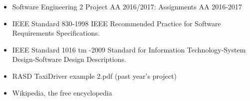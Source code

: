 \begin{itemize}
	\item Software Engineering 2 Project AA 2016/2017: Assignments AA 2016-2017
	\item IEEE Standard 830-1998 IEEE Recommended Practice for Software Requirements Specifications.
	\item IEEE Standard 1016 tm -2009 Standard for Information Technology-System Design-Software Design Descriptions.
	\item RASD TaxiDriver example 2.pdf (past year's project)
	\item Wikipedia, the free encyclopedia
\end{itemize}
